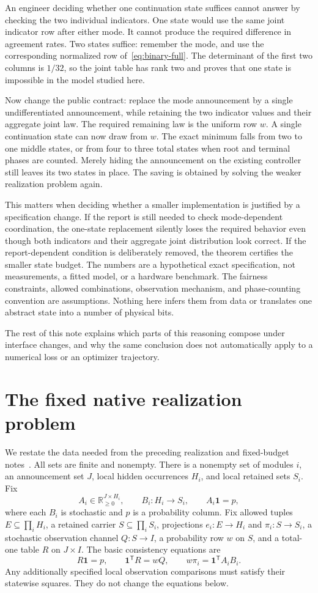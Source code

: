 \documentclass[11pt]{article}
\newcommand{\R}{\mathbb R}
\newcommand{\one}{\mathbf 1}
\theoremstyle{remark}
\begin{document}
An engineer deciding whether one continuation state suffices cannot answer by checking the two individual indicators. One state would use the same joint indicator row after either mode. It cannot produce the required difference in agreement rates. Two states suffice: remember the mode, and use the corresponding normalized row of~\eqref{eq:binary-full}. The determinant of the first two columns is $1/32$, so the joint table has rank two and proves that one state is impossible in the model studied here.

Now change the public contract: replace the mode announcement by a single undifferentiated announcement, while retaining the two indicator values and their aggregate joint law. The required remaining law is the uniform row $w$. A single continuation state can now draw from $w$. The exact minimum falls from two to one middle states, or from four to three total states when root and terminal phases are counted. Merely hiding the announcement on the existing controller still leaves its two states in place. The saving is obtained by solving the weaker realization problem again.

This matters when deciding whether a smaller implementation is justified by a specification change. If the report is still needed to check mode-dependent coordination, the one-state replacement silently loses the required behavior even though both indicators and their aggregate joint distribution look correct. If the report-dependent condition is deliberately removed, the theorem certifies the smaller state budget. The numbers are a hypothetical exact specification, not measurements, a fitted model, or a hardware benchmark. The fairness constraints, allowed combinations, observation mechanism, and phase-counting convention are assumptions. Nothing here infers them from data or translates one abstract state into a number of physical bits.

The rest of this note explains which parts of this reasoning compose under interface changes, and why the same conclusion does not automatically apply to a numerical loss or an optimizer trajectory.

\section{The fixed native realization problem}\label{sec:data}
We restate the data needed from the preceding realization and fixed-budget notes~\cite{JointNote,BudgetNote}. All sets are finite and nonempty. There is a nonempty set of modules $i$, an announcement set $J$, local hidden occurrences $H_i$, and local retained sets $S_i$. Fix
\[
 A_i\in\R_{\ge0}^{J\times H_i},\qquad B_i:H_i\to S_i,
 \qquad A_i\one=p,
\]
where each $B_i$ is stochastic and $p$ is a probability column. Fix allowed tuples $E\subseteq\prod_iH_i$, a retained carrier $S\subseteq\prod_iS_i$, projections $e_i:E\to H_i$ and $\pi_i:S\to S_i$, a stochastic observation channel $Q:S\to I$, a probability row $w$ on $S$, and a total-one table $R$ on $J\times I$. The basic consistency equations are
\[
 R\one=p,\qquad \one^{\mathsf T}R=wQ,\qquad
 w\pi_i=\one^{\mathsf T}A_iB_i.
\]
Any additionally specified local observation comparisons must satisfy their statewise squares. They do not change the equations below.
\end{document}

